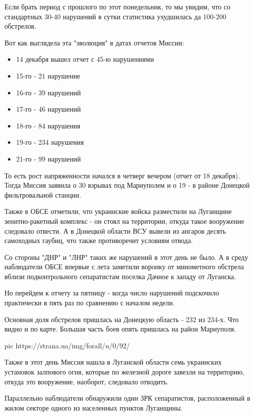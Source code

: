 Если брать период с прошлого по этот понедельник, то мы увидим, что со
стандартных 30-40 нарушений в сутки статистика ухудшилась да 100-200 обстрелов. 

Вот как выглядела эта "эволюция" в датах отчетов Миссии:

\begin{itemize}
  \item 14 декабря вышел отчет с 45-ю нарушениями
  \item 15-го - 21 нарушение
  \item 16-го - 39 нарушений
  \item 17-го - 46 нарушений
  \item 18-го - 84 нарушения
  \item 19-го - 234 нарушения 
  \item 21-го - 99 нарушений
\end{itemize}

То есть рост напряженности начался в четверг вечером (отчет от 18 декабря).
Тогда Миссия заявила о 30 взрывах под Мариуполем и о 19 - в районе Донецкой
фильтровальной станции.

Также в ОБСЕ отметили, что украинские войска разместили на Луганщине
зенитно-ракетный комплекс - он стоял на территории, откуда такое вооружение
следовало отвести. А в Донецкой области ВСУ вывели из ангаров десять самоходных
гаубиц, что также противоречит условиям отвода. 

Со стороны "ДНР" и "ЛНР" таких же нарушений в этот день не было. А в среду
наблюдатели ОБСЕ впервые с лета заметили воронку от минометного обстрела вблизи
подконтрольного сепаратистам поселка Дачное к западу от Луганска. 

Но перейдем к отчету за пятницу - когда число нарушений подскочило практически
в пять раз по сравнению с началом недели. 

Основная доля обстрелов пришлась на Донецкую область - 232 из 234-х. Что видно
и по карте. Большая часть боев опять пришлась на район Мариуполя.

\ifcmt
pic https://strana.ua/img/forall/u/0/92/%
\fi

Также в этот день Миссия нашла в Луганской области семь украинских установок
залпового огня, которые по железной дороге завезли на территорию, откуда это
вооружение, наоборот, следовало отводить.

Параллельно наблюдатели обнаружили один ЗРК сепаратистов, расположенный в жилом
секторе одного из населенных пунктов Луганщины.

